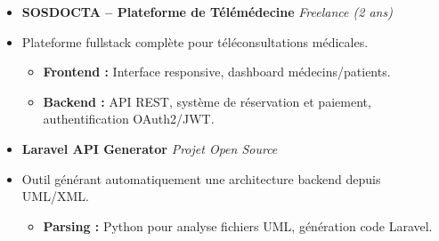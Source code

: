\documentclass[a4paper,11pt]{article}
\begin{document}
\begin{itemize}[leftmargin=*, label={}]
\item \textbf{SOSDOCTA -- Plateforme de Télémédecine} \hfill \textit{Freelance (2 ans)}
\vspace{-2pt}
\item \small{Plateforme fullstack complète pour téléconsultations médicales.}
    \begin{itemize}[leftmargin=0.4cm, nosep, label=\tiny$\bullet$]
        \item \small{\textbf{Frontend :} Interface responsive, dashboard médecins/patients.}
        \item \small{\textbf{Backend :} API REST, système de réservation et paiement, authentification OAuth2/JWT.}
    \end{itemize}
    \vspace{3pt}

\item \textbf{Laravel API Generator} \hfill \textit{Projet Open Source}
\vspace{-2pt}
\item \small{Outil générant automatiquement une architecture backend depuis UML/XML.}
    \begin{itemize}[leftmargin=0.4cm, nosep, label=\tiny$\bullet$]
        \item \small{\textbf{Parsing :} Python pour analyse fichiers UML, génération code Laravel.}
    \end{itemize}

\end{itemize}

\end{document}
